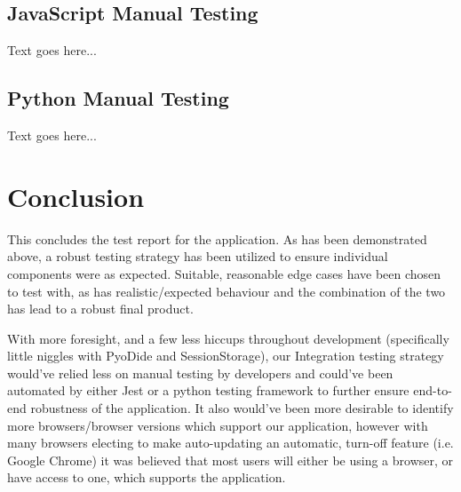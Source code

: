 \subsection{JavaScript Manual Testing}
Text goes here...

\subsection{Python Manual Testing}
Text goes here...

\section{Conclusion}
This concludes the test report for the application. As has been demonstrated above, a robust testing strategy has been utilized to ensure individual components were as expected. Suitable, reasonable edge cases have been chosen to test with, as has realistic/expected behaviour and the combination of the two has lead to a robust final product.

With more foresight, and a few less hiccups throughout development (specifically little niggles with PyoDide and SessionStorage), our Integration testing strategy would've relied less on manual testing by developers and could've been automated by either Jest or a python testing framework to further ensure end-to-end robustness of the application. It also would've been more desirable to identify more browsers/browser versions which support our application, however with many browsers electing to make auto-updating an automatic, turn-off feature (i.e. Google Chrome) it was believed that most users will either be using a browser, or have access to one, which supports the application.